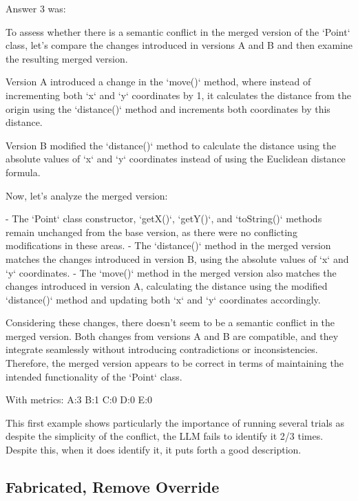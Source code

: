 Answer 3 was:
\begin{spverbatim}
To assess whether there is a semantic conflict in the merged version of the `Point` class, let's compare the changes introduced in versions A and B and then examine the resulting merged version.

Version A introduced a change in the `move()` method, where instead of incrementing both `x` and `y` coordinates by 1, it calculates the distance from the origin using the `distance()` method and increments both coordinates by this distance.

Version B modified the `distance()` method to calculate the distance using the absolute values of `x` and `y` coordinates instead of using the Euclidean distance formula.

Now, let's analyze the merged version:

- The `Point` class constructor, `getX()`, `getY()`, and `toString()` methods remain unchanged from the base version, as there were no conflicting modifications in these areas.
- The `distance()` method in the merged version matches the changes introduced in version B, using the absolute values of `x` and `y` coordinates.
- The `move()` method in the merged version also matches the changes introduced in version A, calculating the distance using the modified `distance()` method and updating both `x` and `y` coordinates accordingly.

Considering these changes, there doesn't seem to be a semantic conflict in the merged version. Both changes from versions A and B are compatible, and they integrate seamlessly without introducing contradictions or inconsistencies. Therefore, the merged version appears to be correct in terms of maintaining the intended functionality of the `Point` class. 
\end{spverbatim}

With metrics:
A:3
B:1
C:0
D:0
E:0

This first example shows particularly the importance of running several trials as despite the simplicity of the conflict, the LLM fails to identify it 2/3 times. Despite this, when it does identify it, it puts forth a good description.

\subsection{Fabricated, Remove Override}

